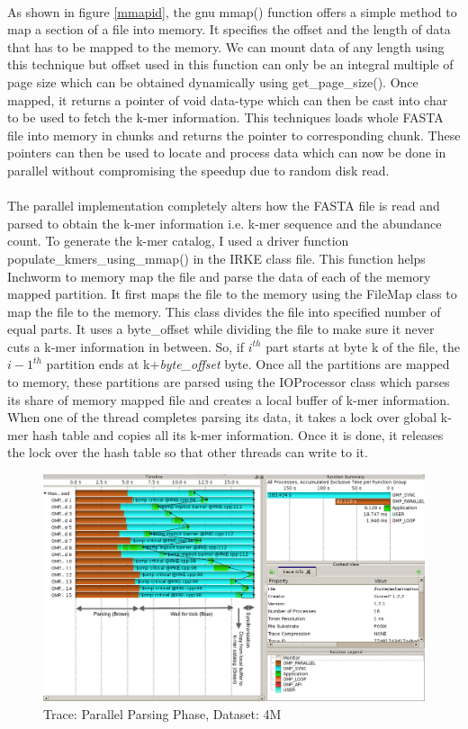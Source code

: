 \label{key}\documentclass[bachinf, english ,zihtitle,final,hyperref,utf8]{zihpub}
\begin{document}
\paragraph{}As shown in figure \ref{mmapid}, the gnu mmap() function offers a simple method to map a section of a file into memory. It specifies the offset and the length of data that has to be mapped to the memory. We can mount data of any length using this technique but offset used in this function can only be an integral multiple of page size which can be obtained dynamically using get\_page\_size(). Once mapped, it returns a pointer of void data-type which can then be cast into char\* to be used to fetch the k-mer information. This techniques loads whole FASTA file into memory in chunks and returns the pointer to corresponding chunk. These pointers can then be used to locate and process data which can now be done in parallel without compromising the speedup due to random disk read. 
\paragraph{} The parallel implementation completely alters how the FASTA file is read and parsed to obtain the k-mer information i.e. k-mer sequence and the abundance count. To generate the k-mer catalog, I used a driver function populate\_kmers\_using\_mmap() in the IRKE class file. This function helps Inchworm to memory map the file and parse the data of each of the memory mapped partition. It first maps the file to the memory using the FileMap class to map the file to the memory. This class divides the file into specified number of equal parts. It uses a byte\_offset while dividing the file to make sure it never cuts a k-mer information in between. So, if $i^{th}$ part starts at byte k of the file, the $i-1^{th}$ partition ends at k+\emph{byte\_offset} byte. Once all the partitions are mapped to memory, these partitions are parsed using the IOProcessor class which parses its share of memory mapped file and creates a local buffer of k-mer information. When one of the thread completes parsing its data, it takes a lock over global k-mer hash table and copies all its k-mer information. Once it is done, it releases the lock over the hash table so that other threads can write to it. 
\begin{figure}[h]
\center
\includegraphics[scale=0.32]{Parse_trace}
\caption{Trace: Parallel Parsing Phase, Dataset: 4M}
\label{trace-parsing}
\end{figure}
\end{document}
